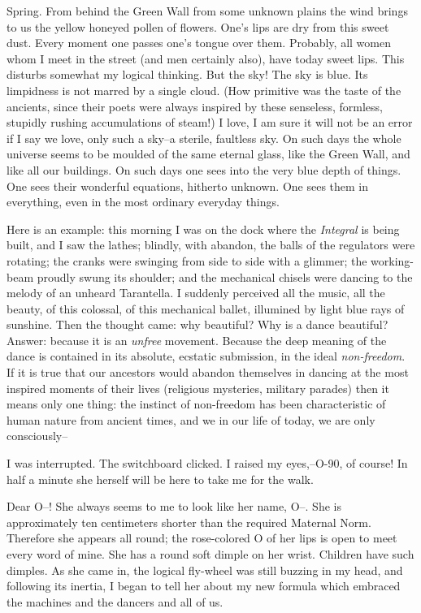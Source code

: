 \documentclass[11pt,openany]{book}
\begin{document}
Spring. From behind the Green Wall from some unknown plains the wind brings to us the yellow honeyed pollen of flowers. One's lips are dry from this sweet dust. Every moment one passes one's tongue over them. Probably, all women whom I meet in the street (and men certainly also), have today sweet lips. This disturbs somewhat my logical thinking. But the sky! The sky is blue. Its limpidness is not marred by a single cloud. (How primitive was the taste of the ancients, since their poets were always inspired by these senseless, formless, stupidly rushing accumulations of steam!) I love, I am sure it will not be an error if I say we love, only such a sky--a sterile, faultless sky. On such days the whole universe seems to be moulded of the same eternal glass, like the Green Wall, and like all our buildings. On such days one sees into the very blue depth of things. One sees their wonderful equations, hitherto unknown. One sees them in everything, even in the most ordinary everyday things.

Here is an example: this morning I was on the dock where the \emph{Integral} is being built, and I saw the lathes; blindly, with abandon, the balls of the regulators were rotating; the cranks were swinging from side to side with a glimmer; the working-beam proudly swung its shoulder; and the mechanical chisels were dancing to the melody of an unheard Tarantella. I suddenly perceived all the music, all the beauty, of this colossal, of this mechanical ballet, illumined by light blue rays of sunshine. Then the thought came: why beautiful? Why is a dance beautiful? Answer: because it is an \emph{unfree} movement. Because the deep meaning of the dance is contained in its absolute, ecstatic submission, in the ideal \emph{non-freedom}. If it is true that our ancestors would abandon themselves in dancing at the most inspired moments of their lives (religious mysteries, military parades) then it means only one thing: the instinct of non-freedom has been characteristic of human nature from ancient times, and we in our life of today, we are only consciously--

I was interrupted. The switchboard clicked. I raised my eyes,--O-90, of course! In half a minute she herself will be here to take me for the walk.

Dear O--! She always seems to me to look like her name, O--. She is approximately ten centimeters shorter than the required Maternal Norm. Therefore she appears all round; the rose-colored O of her lips is open to meet every word of mine. She has a round soft dimple on her wrist. Children have such dimples. As she came in, the logical fly-wheel was still buzzing in my head, and following its inertia, I began to tell her about my new formula which embraced the machines and the dancers and all of us.
\end{document}
